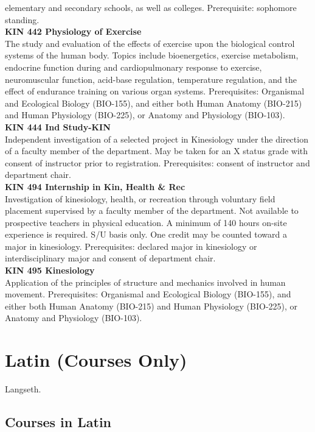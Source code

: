 \documentclass[
  letterpaper,
]{scrbook}
\begin{document}
elementary and secondary schools, as well as colleges. Prerequisite:
sophomore standing.\\
\textbf{KIN 442 Physiology of Exercise}\\
The study and evaluation of the effects of exercise upon the biological
control systems of the human body. Topics include bioenergetics,
exercise metabolism, endocrine function during and cardiopulmonary
response to exercise, neuromuscular function, acid-base regulation,
temperature regulation, and the effect of endurance training on various
organ systems. Prerequisites: Organismal and Ecological Biology
(BIO-155), and either both Human Anatomy (BIO-215) and Human Physiology
(BIO-225), or Anatomy and Physiology (BIO-103).\\
\textbf{KIN 444 Ind Study-KIN}\\
Independent investigation of a selected project in Kinesiology under the
direction of a faculty member of the department. May be taken for an X
status grade with consent of instructor prior to registration.
Prerequisites: consent of instructor and department chair.\\
\textbf{KIN 494 Internship in Kin, Health \& Rec}\\
Investigation of kinesiology, health, or recreation through voluntary
field placement supervised by a faculty member of the department. Not
available to prospective teachers in physical education. A minimum of
140 hours on-site experience is required. S/U basis only. One credit may
be counted toward a major in kinesiology. Prerequisites: declared major
in kinesiology or interdisciplinary major and consent of department
chair.\\
\textbf{KIN 495 Kinesiology}\\
Application of the principles of structure and mechanics involved in
human movement. Prerequisites: Organismal and Ecological Biology
(BIO-155), and either both Human Anatomy (BIO-215) and Human Physiology
(BIO-225), or Anatomy and Physiology (BIO-103).

\section{Latin (Courses Only)}\label{sec-latin}

Langseth.

\subsection{Courses in Latin}\label{courses-in-latin}
\end{document}
